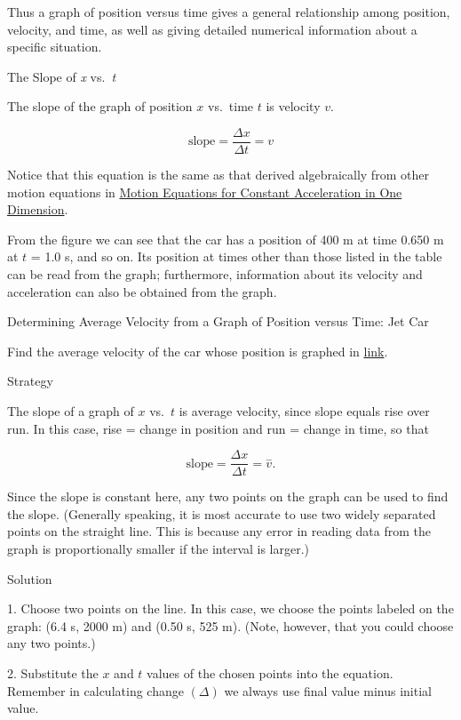\documentclass[
]{book}
\begin{document}
Thus a graph of position versus time gives a general relationship among
position, velocity, and time, as well as giving detailed numerical
information about a specific situation.

\hypertarget{fs-id4125096}{}
The Slope of \emph{x} vs.~\emph{t}

The slope of the graph of position \(x{}\) vs.~time
\(t{}\)\emph{} is velocity \(v{}\).

\leavevmode{}%
\[\text{slope} = \frac{\Delta x}{\Delta t} = v\]

Notice that this equation is the same as that derived algebraically from
other motion equations in \href{/m54773}{Motion Equations for Constant Acceleration in
One Dimension}.

From the figure we can see that the car has a position of 400 m at time
0.650 m at \(t{}\) = 1.0 s, and so on. Its position at times other than
those listed in the table can be read from the graph; furthermore,
information about its velocity and acceleration can also be obtained
from the graph.

\hypertarget{fs-id1714610}{}
Determining Average Velocity from a Graph of Position versus Time: Jet
Car

Find the average velocity of the car whose position is graphed in
\protect\hyperlink{import-auto-id2574769}{link}.

{Strategy}

The slope of a graph of \(x{}\) vs.~\(t{}\) is average velocity, since slope
equals rise over run. In this case, rise = change in position and run =
change in time, so that

\leavevmode{}%
\[{\text{slope} = \frac{\Delta x}{\Delta t} = \overset{-}{v}}.\]

Since the slope is constant here, any two points on the graph can be
used to find the slope. (Generally speaking, it is most accurate to use
two widely separated points on the straight line. This is because any
error in reading data from the graph is proportionally smaller if the
interval is larger.)

{Solution}

1. Choose two points on the line. In this case, we choose the points
labeled on the graph: (6.4 s, 2000 m) and (0.50 s, 525 m). (Note,
however, that you could choose any two points.)

2. Substitute the \(x\) and \(t\) values of the chosen points into the
equation. Remember in calculating change \({(\Delta)}{}\) we always use
final value minus initial value.
\end{document}
